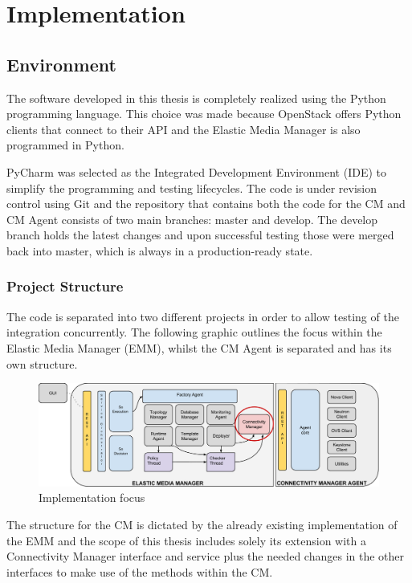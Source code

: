 \chapter{Implementation}


\section{Environment}

The software developed in this thesis is completely realized using the Python programming language. This choice was made because OpenStack offers Python clients that connect to their API and the Elastic Media Manager is also programmed in Python.

PyCharm was selected as the Integrated Development Environment (IDE) to simplify the programming and testing lifecycles. The code is under revision control using Git and the repository that contains both the code for the CM and CM Agent consists of two main branches: master and develop. The develop branch holds the latest changes and upon successful testing those were merged back into master, which is always in a production-ready state.

\subsection{Project Structure}

The code is separated into two different projects in order to allow testing of the integration concurrently. The following graphic outlines the focus within the Elastic Media Manager (EMM), whilst the CM Agent is separated and has its own structure.

\begin{figure}[H]
\centering

\includegraphics[width=\textwidth]{images/implementation/cm_implementation_focus_overview}

\caption{Implementation focus}
\end{figure}

The structure for the CM is dictated by the already existing implementation of the EMM and the scope of this thesis includes solely its extension with a Connectivity Manager interface and service plus the needed changes in the other interfaces to make use of the methods within the CM.

